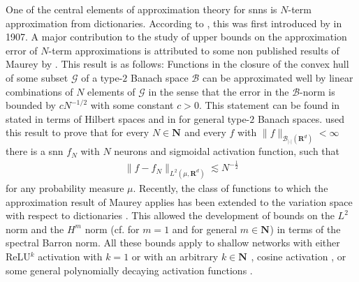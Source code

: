 \documentclass[a4paper]{article}
\newcommand{\nn}[1]{\mathbf{N}^{#1}}
\newcommand{\rr}[1]{\mathbf{R}^{#1}}
\newcommand{\abs}[1]{| #1|}     %
\newcommand{\norm}[2]{\|#1\|_{#2}}
\numberwithin{equation}{section}
\theoremstyle{remark}
\begin{document}
One of the central elements of approximation theory for \glspl{snn} is $N$-term approximation from dictionaries.
According to \citeauthor{DeVore98NonlinearApproximation} \cite{DeVore98NonlinearApproximation}, this was first introduced by \citeauthor{Schmidt07ZurTheorielinearen} \cite{Schmidt07ZurTheorielinearen} in 1907.
A major contribution to the study of upper bounds
on the approximation error of $N$-term approximations
is attributed to some non published results of Maurey by \citeauthor{Pisier80RemarquesResultatNon} \cite{Pisier80RemarquesResultatNon}.
This result is as follows:
Functions in the closure of the convex hull
of some subset $\mathcal{G}$ of a type-$2$ Banach space $\mathcal{B}$
can be approximated well by linear combinations
of $N$ elements of $\mathcal{G}$ in the sense that 
the error in the $\mathcal{B}$-norm is bounded by $cN^{-1/2}$
with some constant $c>0$.
This statement can be found in \cite[Lemma 1]{Barron93UniversalApproximationBounds}
stated in terms of Hilbert spaces and in \cite[Theorem 1]{Siegel22SharpBoundsApproximation}
for general type-$2$ Banach spaces.
\citeauthor{Barron93UniversalApproximationBounds} \cite{Barron93UniversalApproximationBounds}
used this result to prove
that for every $N\in\nn{}$ and every $f$ with $\norm{f}{\mathscr{B}_{\abs{\cdot}}(\rr{d})}<\infty$
there is a \gls{snn} $f_N$ with $N$ neurons
and sigmoidal activation function, such that
\begin{align*}
    \norm{f-f_N}{L^2(\mu,\rr{d})}\lesssim N^{-\frac{1}{2}}
\end{align*}
for any probability measure $\mu$.
Recently, the class of functions to which the approximation result of Maurey applies
has been extended to the variation space with respect to dictionaries 
\cite{Bach17BreakingCurseDimensionality,Kurkova01BoundsRatesVariableBasis,Ma22UniformApproximationRates,Siegel22SharpBoundsApproximation,Siegel23CharacterizationVariationSpaces}.
This allowed the development of bounds
on the $L^2$ norm
\cite{Breiman93HingingHyperplanesRegression,Klusowski18ApproximationCombinationsReLU}
and the $H^m$ norm
(cf. \cite{Lu21PrioriGeneralizationAnalysis,Chen23RegularityTheoryStatic} for $m=1$
and \cite{Siegel20ApproximationRatesNeural,Siegel22HighOrderApproximationRates} for general $m\in\nn{}$)
in terms of the spectral Barron norm.
All these bounds apply to shallow networks with either ReLU$^k$ activation with $k=1$ \cite{Breiman93HingingHyperplanesRegression}
or with an arbitrary $k\in\nn{}$ \cite{Siegel22HighOrderApproximationRates},
cosine activation \cite{Siegel22HighOrderApproximationRates,Chen23RegularityTheoryStatic},
or some general polynomially decaying activation functions \cite{Siegel20ApproximationRatesNeural}.
\end{document}
